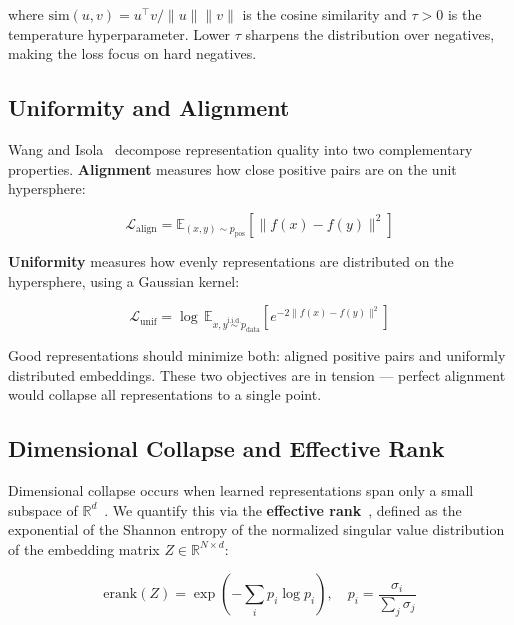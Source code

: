 \documentclass{article}
\begin{document}
where $\text{sim}(u, v) = u^\top v / \|u\|\|v\|$ is the cosine similarity and 
$\tau > 0$ is the temperature hyperparameter. Lower $\tau$ sharpens the 
distribution over negatives, making the loss focus on hard negatives.

\subsection{Uniformity and Alignment}

Wang and Isola~\cite{wang2020understanding} decompose representation quality 
into two complementary properties. \textbf{Alignment} measures how close 
positive pairs are on the unit hypersphere:

\begin{equation}
  \mathcal{L}_\text{align} = \mathbb{E}_{(x,y)\sim p_\text{pos}} 
  \left[\|f(x) - f(y)\|^2\right]
\end{equation}

\textbf{Uniformity} measures how evenly representations are distributed on 
the hypersphere, using a Gaussian kernel:

\begin{equation}
  \mathcal{L}_\text{unif} = \log\, \mathbb{E}_{x,y \overset{\text{i.i.d.}}
  {\sim} p_\text{data}} \left[e^{-2\|f(x)-f(y)\|^2}\right]
\end{equation}

Good representations should minimize both: aligned positive pairs and 
uniformly distributed embeddings. These two objectives are in tension --- 
perfect alignment would collapse all representations to a single point.

\subsection{Dimensional Collapse and Effective Rank}

Dimensional collapse occurs when learned representations span only a small 
subspace of $\mathbb{R}^d$~\cite{hua2021feature}. We quantify this via the 
\textbf{effective rank}~\cite{roy2007effective}, defined as the exponential 
of the Shannon entropy of the normalized singular value distribution of the 
embedding matrix $Z \in \mathbb{R}^{N \times d}$:

\begin{equation}
  \text{erank}(Z) = \exp\left(-\sum_i p_i \log p_i\right), 
  \quad p_i = \frac{\sigma_i}{\sum_j \sigma_j}
\end{equation}
\end{document}
